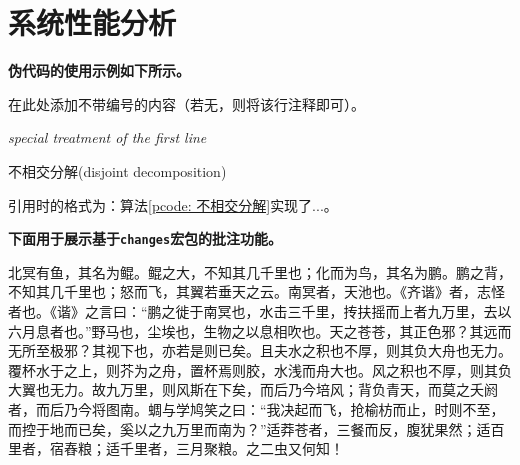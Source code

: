 
\section{系统性能分析}

{\bf 伪代码的使用示例如下所示。}

\begin{algorithm}

在此处添加不带编号的内容（若无，则将该行注释即可）。\\
\LinesNumbered %
\BlankLine

\emph{special treatment of the first line}\;
\caption{不相交分解(disjoint decomposition)}\label{pcode: 不相交分解} %
\end{algorithm}

引用时的格式为：算法\ref{pcode: 不相交分解}实现了...。

{\bf 下面用于展示基于\verb|changes|宏包的批注功能。}

北冥有鱼，其名为鲲。鲲之大，不知其几千里也；化而为鸟，其名为鹏。鹏之背，不知其几千里也；怒而飞，其翼若垂天之云。南冥者，天池也。《齐谐》者，志怪者也。《谐》之言曰：“鹏之徙于南冥也，水击三千里，抟扶摇而上者九万里，去以六月息者也。”野马也，尘埃也，生物之以息相吹也。天之苍苍，其正色邪？其远而无所至极邪？其视下也，亦若是则已矣。且夫水之积也不厚，则其负大舟也无力。覆杯水于之上，则芥为之舟，置杯焉则胶，水浅而舟大也。风之积也不厚，则其负大翼也无力。故九万里，则风斯在下矣，而后乃今培风；背负青天，而莫之夭阏者，而后乃今将图南。蜩与学鸠笑之曰：“我决起而飞，抢榆枋而止，时则不至，而控于地而已矣，奚以之九万里而南为？”适莽苍者，三餐而反，腹犹果然；适百里者，宿舂粮；适千里者，三月聚粮。之二虫又何知！

